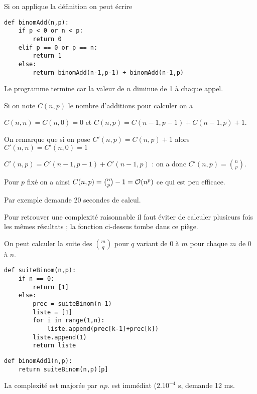 \begin{Answer}

Si on applique la définition on peut écrire
\begin{lstlisting}
def binomAdd(n,p):
    if p < 0 or n < p:
        return 0
    elif p == 0 or p == n:
        return 1
    else:        
        return binomAdd(n-1,p-1) + binomAdd(n-1,p)
\end{lstlisting} 

Le programme termine car la valeur de $n$ diminue de 1 à chaque appel.

Si on note $C(n,p)$ le nombre d'additions pour calculer  on a 

$C(n,n)=C(n,0)=0$ et $C(n,p)=C(n-1,p-1)+C(n-1,p)+1$.

On remarque que si on pose $C'(n,p) = C(n,p)+1$ alors $C'(n,n)=C'(n,0)=1$ 

$C'(n,p)=C'(n-1,p-1)+C'(n-1,p)$ : on a donc $C'(n,p)=\binom{n}{p}$.

Pour $p$ fixé on a ainsi $C(n,p)=\binom{n}{p}-1 = {\cal O}(n^p)$ ce qui est peu efficace. 

Par exemple  demande 20 secondes de calcul.

\medskip

Pour retrouver une complexité raisonnable il faut éviter de calculer plusieurs fois les mêmes résultats ; la fonction ci-dessus tombe dans ce piège. 

On peut calculer la suite des $\binom mq$ pour $q$ variant de 0 à $m$ pour chaque $m$ de 0 à $n$.
\begin{lstlisting}
def suiteBinom(n,p):
    if n == 0:
        return [1]
    else:        
        prec = suiteBinom(n-1)
        liste = [1] 
        for i in range(1,n):
            liste.append(prec[k-1]+prec[k])
        liste.append(1)
        return liste
\end{lstlisting} 
\begin{lstlisting}
def binomAdd1(n,p):
    return suiteBinom(n,p)[p]
\end{lstlisting} 

La complexité est majorée par $np$.  est immédiat ($2.10^{-4}$ s,  demande 12 ms.
\end{Answer}
